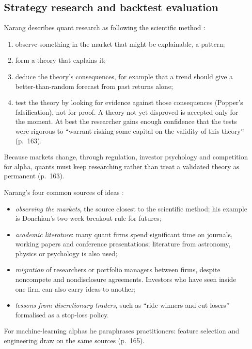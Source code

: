 \subsection{Strategy research and backtest evaluation}

\begin{qfmethod}\label{meth:hypothesis-driven-strategy-research}
 Narang describes quant research as following the scientific method \citep[chap.~``Research'', sec.~9.1, pp.~161--163]{s7-narang}:
\begin{enumerate}
\item observe something in the market that might be explainable, a pattern;
\item form a theory that explains it;
\item deduce the theory's consequences, for example that a trend should give a better-than-random forecast from past returns alone;
\item test the theory by looking for evidence against those consequences (Popper's falsification), not for proof. A theory not yet disproved is accepted only for the moment. At best the researcher gains enough confidence that the tests were rigorous to ``warrant risking some capital on the validity of this theory'' (p.~163).
\end{enumerate}
Because markets change, through regulation, investor psychology and competition for alpha, quants must keep researching rather than treat a validated theory as permanent (p.~163).

Narang's four common sources of ideas \citep[sec.~9.2, pp.~163--165]{s7-narang}:
\begin{itemize}
\item \emph{observing the markets}, the source closest to the scientific method; his example is Donchian's two-week breakout rule for futures;
\item \emph{academic literature}: many quant firms spend significant time on journals, working papers and conference presentations; literature from astronomy, physics or psychology is also used;
\item \emph{migration} of researchers or portfolio managers between firms, despite noncompete and nondisclosure agreements. Investors who have seen inside one firm can also carry ideas to another;
\item \emph{lessons from discretionary traders}, such as ``ride winners and cut losers'' formalised as a stop-loss policy.
\end{itemize}
For machine-learning alphas he paraphrases practitioners: feature selection and engineering draw on the same sources (p.~165).


\end{qfmethod}
